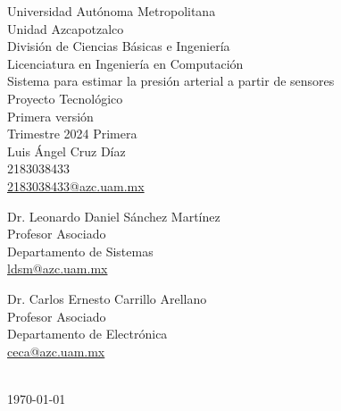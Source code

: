 \begin{titlepage}
    \vspace*{\fill}
    \center
    
    \Large Universidad Autónoma Metropolitana\\
    \large {Unidad Azcapotzalco}\\
    \normalsize
    División de Ciencias Básicas e Ingeniería\\
    Licenciatura en Ingeniería en Computación\\[2cm]
    
    {\large Sistema para estimar la presión arterial a partir de sensores}\\

    Proyecto Tecnológico\\[0.2cm]
    
    Primera versión\\[0.2cm]
    
    Trimestre 2024 Primera \\[2cm]
    
    Luis Ángel Cruz Díaz\\
    2183038433\\
    \href{mailto:2183038433@azc.uam.mx}{2183038433@azc.uam.mx}\\[2cm]
    
    \begin{minipage}{0.4\textwidth}
        \centering
        Dr. Leonardo Daniel Sánchez Martínez \\
        Profesor Asociado\\
        Departamento de Sistemas\\
        \href{mailto:ldsm@azc.uam.mx}{ldsm@azc.uam.mx}
    \end{minipage}
    \begin{minipage}{0.4\textwidth}
        \centering
        Dr. Carlos Ernesto Carrillo Arellano\\
        Profesor Asociado\\
        Departamento de Electrónica\\
        \href{mailto:ceca@azc.uam.mx}{ceca@azc.uam.mx}%
    \end{minipage}\\[1cm]
    
    \textspanish{\today}
    
    \vfill
    \vspace*{\fill}
\end{titlepage}